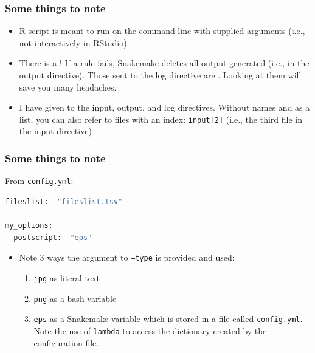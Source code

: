 \begin{frame}

\frametitle{Some things to note}

\begin{itemize}
  \item R script is meant to run on the command-line with supplied arguments (i.e., not interactively in RStudio).
  \item There is a {}!  If a rule fails, Snakemake deletes all output generated (i.e., in the output directive).  Those sent to the log directive are {}.  Looking at them will save you many headaches.
  \item I have given {} to the input, output, and log directives.  Without names and as a list, you can also refer to files with an index:  {\texttt{input[2]}} (i.e., the third file in the input directive)
\end{itemize}

\end{frame}


\begin{frame}[fragile]

\frametitle{Some things to note}

From {\texttt{config.yml}}:
\begin{tiny}
\begin{lstlisting}[frame=single,language=bash]
fileslist:  "fileslist.tsv"

my_options:
  postscript:  "eps"
\end{lstlisting}
\end{tiny}

\begin{itemize}
  \item Note 3 ways the argument to {\texttt{--type}} is provided and used:
  \begin{enumerate}
    \item {\texttt{jpg}} as literal text
    \item {\texttt{png}} as a bash variable
    \item {\texttt{eps}} as a Snakemake variable which is stored in a file called {\texttt{config.yml}}.  Note the use of {\texttt{lambda}} to access the dictionary created by the configuration file.
  \end{enumerate}
\end{itemize}

\end{frame}


